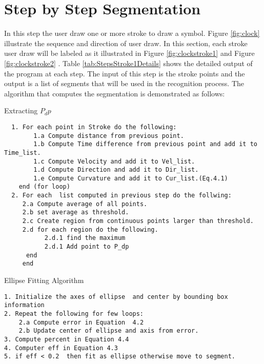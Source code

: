 \section{Step by Step Segmentation}
\label{apsec:stepseg}

In this step the user draw one or more stroke to draw a symbol. Figure \ref{fig:clock} illustrate the sequence and direction of user draw. In this section, each stroke user draw will be labeled as it illustrated in Figure \ref{fig:clockstroke1} and Figure \ref{fig:clockstroke2} . Table \ref{tab:StepsStroke1Details} shows the detailed output of the program at each step. The input of this step is the stroke points and the output is a list of segments that will be used in the recognition process. The algorithm that computes the segmentation is demonstrated as follows:


\begin{algorithm}
\caption{Extracting $P_dp$}
\label{extractpdp}
\begin{verbatim}
  1. For each point in Stroke do the following:
  		1.a Compute distance from previous point.
  		1.b Compute Time difference from previous point and add it to Time_list.  
  		1.c Compute Velocity and add it to Vel_list. 
  		1.d Compute Direction and add it to Dir_list.
  	 	1.e Compute Curvature and add it to Cur_list.(Eq.4.1) 
  	end (for loop)
  2. For each  list computed in previous step do the follwing:   
  	 2.a Compute average of all points. 
  	 2.b set average as threshold.  
  	 2.c Create region from continuous points larger than threshold. 
  	 2.d for each region do the following. 
  	 	   2.d.1 find the maximum 
  	 	   2.d.1 Add point to P_dp 
  	  end
     end 
\end{verbatim}	
\end{algorithm}
\begin{algorithm}
\caption{Ellipse Fitting Algorithm}
\label{ellipseFitAlg}
\begin{verbatim}
1. Initialize the axes of ellipse  and center by bounding box information
2. Repeat the following for few loops: 
	2.a Compute error in Equation  4.2 
	2.b Update center of ellipse and axis from error. 
3. Compute percent in Equation 4.4 
4. Computer eff in Equation 4.3 
5. if eff < 0.2  then fit as ellipse otherwise move to segment. 
\end{verbatim}	
\end{algorithm}
 
